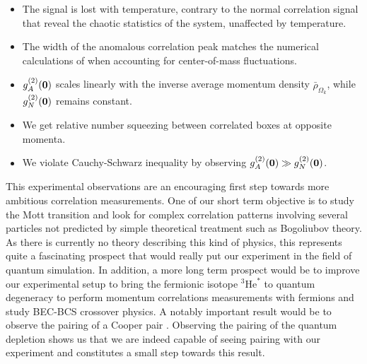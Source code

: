 \begin{itemize}
\begin{itemize}
        \item The signal is lost with temperature, contrary to the normal correlation signal that reveal the chaotic statistics of the system, unaffected by temperature.
        \item The width of the anomalous correlation peak matches the numerical calculations of \cite{butera2020} when accounting for center-of-mass fluctuations.
        \item $g^{(2)}_A(\bm{0})$ scales linearly with the inverse average momentum density $\bar{\rho}_{\Omega_k}$, while $g^{(2)}_N(\bm{0})$ remains constant.
        \item We get relative number squeezing between correlated boxes at opposite momenta.
        \item We violate Cauchy-Schwarz inequality by observing $g^{(2)}_A(\bm{0}) \gg g^{(2)}_N(\bm{0})$.
        
    \end{itemize}
\end{itemize}

This experimental observations are an encouraging first step towards more ambitious correlation measurements. One of our short term objective is to study the Mott transition and look for complex correlation patterns involving several particles not predicted by simple theoretical treatment such as Bogoliubov theory. As there is currently no theory describing this kind of physics, this represents quite a fascinating prospect that would really put our experiment in the field of quantum simulation. In addition, a more long term prospect would be to improve our experimental setup to bring the fermionic isotope $^3 \mathrm{He}^*$ to quantum degeneracy to perform momentum correlations measurements with fermions and study BEC-BCS crossover physics. A notably important result would be to observe the \kmk pairing of a Cooper pair \cite{cooper1956bound}. Observing the \kmk pairing of the quantum depletion shows us that we are indeed capable of seeing \kmk pairing with our experiment and constitutes a small step towards this result.


